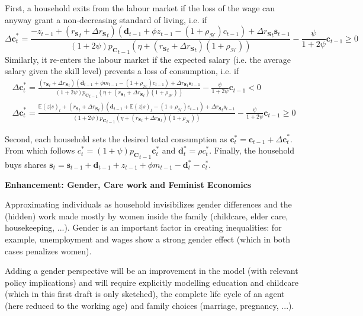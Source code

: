 \documentclass[a4paper, headings=standardclasses]{scrartcl}
\newenvironment{enh}[1][]{\begin{framed}\noindent\textbf{Enhancement: #1}\par}{\end{framed}}
\begin{document}
First, a household exits from the labour market if the loss of the wage can anyway grant a non-decreasing standard of living, i.e. if
$$ {\Delta \mathbf{c}}^*_t = \frac{-z_{t-1} + ({r_\mathbf{S}}_t + {\Delta r_\mathbf{S}}_{t})(\mathbf{d}_{t-1} + \phi z_{t-1} - (1+\rho_{\mathcal{H}}) c_{t-1}) + {\Delta r_\mathbf{S}}_{t} \mathbf{s}_{t-1}}{(1+2\psi){p_\mathbf{C}}_{t-1}(\eta +  ({r_\mathbf{S}}_t + {\Delta r_\mathbf{S}}_{t})(1+\rho_{\mathcal{H}}))} - \frac{\psi}{1+2\psi}{\mathbf{c}_{t-1}} \ge 0$$
Similarly, it re-enters the labour market if the expected salary (i.e. the average salary given the skill level) prevents a loss of consumption, i.e. if
\begin{multline*}
	{\Delta \mathbf{c}}^*_t = \frac{({r_\mathbf{S}}_t + {\Delta r_\mathbf{S}}_{t})(\mathbf{d}_{t-1} + \phi m_{t-1} - (1+\rho_{\mathcal{H}}) c_{t-1}) + {\Delta r_\mathbf{S}}_{t} \mathbf{s}_{t-1}}{(1+2\psi){p_\mathbf{C}}_{t-1}(\eta +  ({r_\mathbf{S}}_t + {\Delta r_\mathbf{S}}_{t})(1+\rho_{\mathcal{H}}))} - \frac{\psi}{1+2\psi}{\mathbf{c}_{t-1}} < 0 \\
	{\Delta \mathbf{c}}^*_t = \frac{{\mathbb{E}(z|s)}_{t} + ({r_\mathbf{S}}_t + {\Delta r_\mathbf{S}}_{t})(\mathbf{d}_{t-1} + {\mathbb{E}(z|s)}_{t} - (1+\rho_{\mathcal{H}}) c_{t-1}) + {\Delta r_\mathbf{S}}_{t} \mathbf{s}_{t-1}}{(1+2\psi){p_\mathbf{C}}_{t-1}(\eta +  ({r_\mathbf{S}}_t + {\Delta r_\mathbf{S}}_{t})(1+\rho_{\mathcal{H}}))} - \frac{\psi}{1+2\psi}{\mathbf{c}_{t-1}} \ge 0
\end{multline*}

Second, each household sets the desired total consumption as $\mathbf{c}^*_t = \mathbf{c}_{t-1} + {\Delta \mathbf{c}}^*_t$. From which follows $c^*_t = (1+\psi) {p_\mathbf{C}}_{t-1} \mathbf{c}^*_t$ and $\mathbf{d}^*_t = \rho c^*_t$. Finally, the household buys shares $\mathbf{s}_t = \mathbf{s}_{t-1} + \mathbf{d}_{t-1} + z_{t-1} + \phi m_{t-1} - \mathbf{d}^*_t - c^*_t$.

\begin{enh}[Gender, Care work and Feminist Economics]
	Approximating individuals as household invisibilizes gender differences and the (hidden) work made mostly by women inside the family (childcare, elder care, housekeeping, ...).
	Gender is an important factor in creating inequalities: for example, unemployment and wages show a strong gender effect (which in both cases penalizes women).

	Adding a gender perspective will be an improvement in the model (with relevant policy implications) and will require explicitly modelling education and childcare (which in this first draft is only sketched), the complete life cycle of an agent (here reduced to the working age) and family choices (marriage, pregnancy, ...).
\end{enh}
\end{document}
